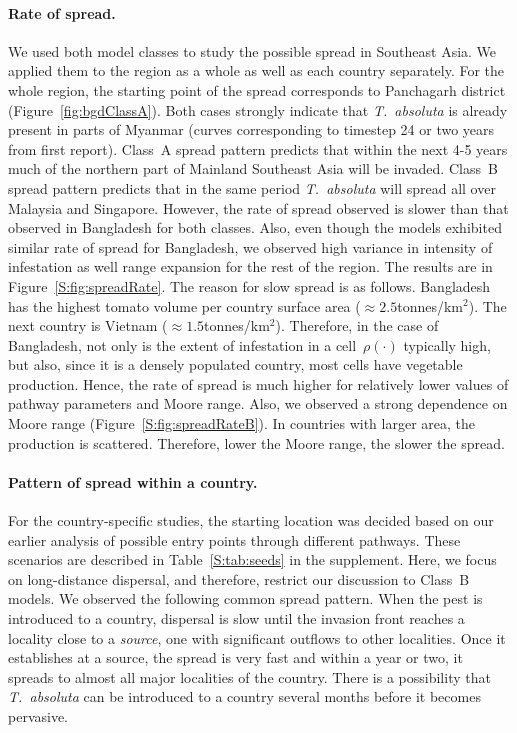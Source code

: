 \documentclass[11pt]{article}
\newcommand{\tuta}{\emph{T.~absoluta}}
\newcommand{\infest}{\rho}
\theoremstyle{definition}
\begin{document}
\paragraph{Rate of spread.}
We used both model classes to study the possible spread in Southeast Asia.
We applied them to the region as a whole as well as each country
separately. For the whole region, the starting point of the spread
corresponds to Panchagarh district (Figure~\ref{fig:bgdClassA}). Both cases
strongly indicate that \tuta{} is already present in parts of Myanmar
(curves corresponding to timestep 24 or two years from first report).
Class~A spread pattern predicts that within the next 4-5 years much of the
northern part of Mainland Southeast Asia will be invaded. Class~B spread
pattern predicts that in the same period \tuta{} will spread all over
Malaysia and Singapore.  However, the rate of spread observed is slower
than that observed in Bangladesh for both classes. Also, even though the
models exhibited similar rate of spread for Bangladesh, we observed high
variance in intensity of infestation as well range expansion for the rest
of the region. The results are in Figure~\ref{S:fig:spreadRate}. The reason
for slow spread is as follows.  Bangladesh has the highest tomato volume
per country surface area ($\approx2.5$tonnes/km$^2$).  The next country is
Vietnam ($\approx1.5$tonnes/km$^2$). Therefore, in the case of Bangladesh,
not only is the extent of infestation in a cell~$\infest(\cdot)$ typically
high, but also, since it is a densely populated country, most cells have
vegetable production. Hence, the rate of spread is much higher for
relatively lower values of pathway parameters and Moore range. Also, we
observed a strong dependence on Moore range
(Figure~\ref{S:fig:spreadRateB}).  In countries with larger area, the
production is scattered. Therefore, lower the Moore range, the slower the
spread.

\paragraph{Pattern of spread within a country.} For the
country-specific studies, the starting location was decided based on
our earlier analysis of possible entry points through different pathways.
These scenarios are described in Table~\ref{S:tab:seeds} in the supplement.
Here, we focus on long-distance dispersal, and therefore, restrict our
discussion to Class~B models. We observed the following common spread
pattern.  When the pest is introduced to a country, dispersal is slow until
the invasion front reaches a locality close to a \emph{source}, one with
significant outflows to other localities. Once it establishes at a source,
the spread is very fast and within a year or two, it spreads to almost all
major localities of the country. There is a possibility that \tuta{} can be
introduced to a country several months before it becomes pervasive. 
\end{document}
